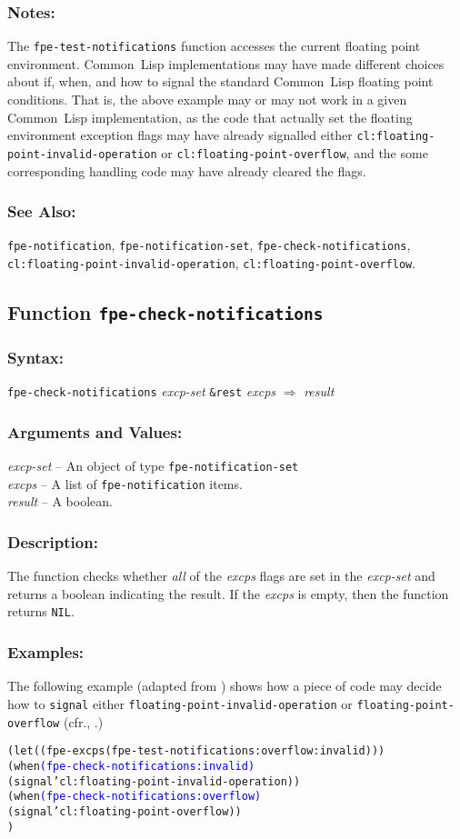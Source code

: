 \documentclass[10pt,fleqn]{article}
\newcommand{\CL}{\textsf{Common~Lisp}}
\newcommand{\code}[1]{\texttt{#1}}
\newcommand{\varname}[1]{\textit{#1}}
\newcommand{\DDictionaryItem}[1]{\vspace*{6pt}\noindent\hrulefill\vspace*{-9pt}\subsection*{#1}}
\newcommand{\DSyntax}{\subsubsection*{Syntax:}}
\newcommand{\DArgsNValues}{\subsubsection*{Arguments and Values:}}
\newcommand{\DDescription}{\subsubsection*{Description:}}
\newcommand{\DExamples}{\subsubsection*{Examples:}}
\newcommand{\DNotes}{\subsubsection*{Notes:}}
\newcommand{\DSeeAlso}{\subsubsection*{See Also:}}
\begin{document}
\DNotes{}

The \code{fpe-test-notifications} function accesses the current floating
point environment.  \CL{} implementations may have made different
choices about if, when, and how to signal the standard \CL{} floating
point conditions.  That is, the above example may or may not work in a
given \CL{} implementation, as the code that actually set the floating
environment exception flags may have already signalled either
\code{cl:floating-point-invalid-operation} or
\code{cl:floating-point-overflow}, and the some corresponding handling
code may have already cleared the flags.

\DSeeAlso{}

\code{fpe-notification}, \code{fpe-notification-set},
\code{fpe-check-notifications},\\
\code{cl:floating-point-invalid-operation},
\code{cl:floating-point-overflow}.


\DDictionaryItem{Function \code{fpe-check-notifications}}
\index{F!\code{fpe-check-notifications}}

\DSyntax{}

\code{fpe-check-notifications} \varname{excp-set} \code{\&rest} \varname{excps}
$\Rightarrow$ \varname{result}

\DArgsNValues{}

\varname{excp-set} -- An object of type \code{fpe-notification-set}\\
\varname{excps} -- A list of \code{fpe-notification} items.\\
\varname{result} -- A boolean.

\DDescription{}

The function checks whether \emph{all} of the \varname{excps} flags
are set in the \varname{excp-set} and returns a boolean indicating the
result.  If the \varname{excps} is empty, then the function returns
\code{NIL}.

\DExamples{}

The following example (adapted from \cite{2018:C18}) shows how a piece of
code may decide how to \code{signal} either
\code{floating-point-invalid-operation} or
\code{floating-point-overflow} (cfr., \cite{1996:ANSIHyperSpec}.)

\begin{alltt}
(let ((fpe-excps (fpe-test-notifications :overflow :invalid)))
   (when \textcolor{blue}{(fpe-check-notifications :invalid)}
     (signal 'cl:floating-point-invalid-operation))
   (when \textcolor{blue}{(fpe-check-notifications :overflow)}
     (signal 'cl:floating-point-overflow))
   )
\end{alltt}
\end{document}
